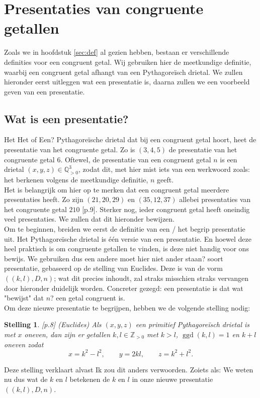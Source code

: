 \documentclass[12pt,reqno]{article}
\newcommand*{\ZZ}{\ensuremath{\mathbb{Z}}}
\newcommand*{\QQ}{\ensuremath{\mathbb{Q}}}
\theoremstyle{theorem}
\newtheorem{theorem}{Stelling}
\theoremstyle{definition}
\DeclareMathOperator{\ggd}{ggd}
\begin{document}
	
	\section{Presentaties van congruente getallen}\label{sec:lotte}
	Zoals we in hoofdstuk \ref{sec:def} al gezien hebben, bestaan er verschillende definities voor een congruent getal. Wij gebruiken hier de meetkundige definitie, waarbij een congruent getal afhangt van een Pythagore\"isch drietal. We zullen hieronder eerst uitleggen wat een presentatie is, daarna zullen we een voorbeeld geven van een presentatie.
	
	\subsection{Wat is een presentatie?}\label{sec:presentaties}
	Het {\color{red}Het of Een?} Pythagore\"ische drietal dat bij een congruent getal hoort, heet de presentatie van het congruente getal. Zo is $(3,4,5)$ de presentatie van het congruente getal $6$. Oftewel,  de presentatie van een congruent getal $n$ is een drietal $(x,y,z)\in\QQ^3_{>0}$, zodat dit, met {\color{red}hier mist iets van een werkwoord zoals: het berkenen volgens} de meetkundige definitie, $n$ geeft.\\
	
	Het is belangrijk om hier op te merken dat een congruent getal meerdere presentaties heeft. Zo zijn $(21,20,29)$ en $(35,12,37)$ allebei presentaties van het congruente getal $210$ \cite{Oort}[p.9]. Sterker nog, ieder congruent getal heeft oneindig veel presentaties. We zullen dat {\color{red}dit} hieronder bewijzen.\\
	
	Om te beginnen, breiden we eerst de definitie van {\color{red}een / het begrip} presentatie uit. Het Pythagore\"ische drietal is \'e\'en versie van een presentatie. En hoewel deze heel praktisch is om congruente getallen te vinden, is deze niet handig voor ons bewijs. We gebruiken dus een andere {\color{red}moet hier niet ander staan?} soort presentatie, gebaseerd op de stelling van Euclides. Deze is van de vorm $((k,l),D,n)$; wat dit precies inhoudt, zal straks {\color{red}misschien straks vervangen door hieronder} duidelijk worden. Concreter gezegd: een presentatie is dat wat "bewijst" dat {\color{red}$n$?} een getal congruent is.\\
	
	Om deze nieuwe presentatie te begrijpen, hebben we de volgende stelling nodig:
	\begin{theorem}\label{def:euclides}
		\cite{Oort}[p.8] (Euclides) Als $(x,y,z)$ een primitief Pythagore\"isch drietal is met $x$ oneven, dan zijn er getallen $k,l\in\ZZ_{>0}$ met $k>l$, $\ggd(k,l)=1$ en $k+l$ oneven zodat
		\begin{equation*}
			x=k^2-l^2,\qquad y=2kl,\qquad z=k^2+l^2.
		\end{equation*}
	\end{theorem}
	\noindent Deze stelling verklaart alvast {\color{red}Ik zou dit anders verwoorden. Zoiets als: We weten nu dus wat de $k$ en $l$ betekenen} de $k$ en $l$ in onze nieuwe presentatie $((k,l),D,n)$.\\
	
\end{document}
